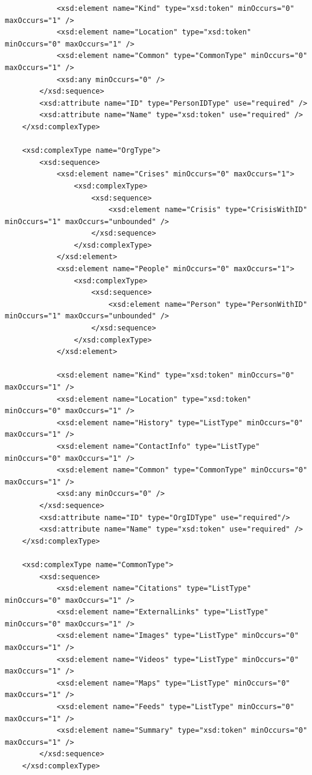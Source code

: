 \documentclass[12pt]{report}
\begin{document}
\begin{lstlisting}
            <xsd:element name="Kind" type="xsd:token" minOccurs="0" maxOccurs="1" />
            <xsd:element name="Location" type="xsd:token" minOccurs="0" maxOccurs="1" />
            <xsd:element name="Common" type="CommonType" minOccurs="0" maxOccurs="1" />
            <xsd:any minOccurs="0" />
        </xsd:sequence>
        <xsd:attribute name="ID" type="PersonIDType" use="required" />
        <xsd:attribute name="Name" type="xsd:token" use="required" />
    </xsd:complexType>

    <xsd:complexType name="OrgType">
        <xsd:sequence>
            <xsd:element name="Crises" minOccurs="0" maxOccurs="1">
                <xsd:complexType>
                    <xsd:sequence>
                        <xsd:element name="Crisis" type="CrisisWithID" minOccurs="1" maxOccurs="unbounded" />
                    </xsd:sequence>
                </xsd:complexType>
            </xsd:element>
            <xsd:element name="People" minOccurs="0" maxOccurs="1">
                <xsd:complexType>
                    <xsd:sequence>
                        <xsd:element name="Person" type="PersonWithID" minOccurs="1" maxOccurs="unbounded" />
                    </xsd:sequence>
                </xsd:complexType>
            </xsd:element>
            
            <xsd:element name="Kind" type="xsd:token" minOccurs="0" maxOccurs="1" />
            <xsd:element name="Location" type="xsd:token" minOccurs="0" maxOccurs="1" />
            <xsd:element name="History" type="ListType" minOccurs="0" maxOccurs="1" />
            <xsd:element name="ContactInfo" type="ListType" minOccurs="0" maxOccurs="1" />
            <xsd:element name="Common" type="CommonType" minOccurs="0" maxOccurs="1" />
            <xsd:any minOccurs="0" />
        </xsd:sequence>
        <xsd:attribute name="ID" type="OrgIDType" use="required"/>
        <xsd:attribute name="Name" type="xsd:token" use="required" />
    </xsd:complexType>

    <xsd:complexType name="CommonType">
        <xsd:sequence>
            <xsd:element name="Citations" type="ListType" minOccurs="0" maxOccurs="1" />
            <xsd:element name="ExternalLinks" type="ListType" minOccurs="0" maxOccurs="1" />
            <xsd:element name="Images" type="ListType" minOccurs="0" maxOccurs="1" />
            <xsd:element name="Videos" type="ListType" minOccurs="0" maxOccurs="1" />
            <xsd:element name="Maps" type="ListType" minOccurs="0" maxOccurs="1" />
            <xsd:element name="Feeds" type="ListType" minOccurs="0" maxOccurs="1" />
            <xsd:element name="Summary" type="xsd:token" minOccurs="0" maxOccurs="1" />
        </xsd:sequence>
    </xsd:complexType>


\end{lstlisting}
\end{document}
